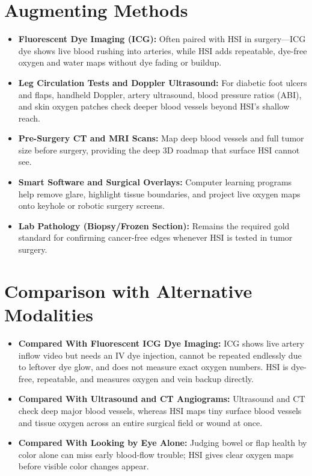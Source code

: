 \section{Augmenting Methods}
\begin{itemize}
    \item \textbf{Fluorescent Dye Imaging (ICG):} Often paired with HSI in surgery---ICG dye shows live blood rushing into arteries, while HSI adds repeatable, dye-free oxygen and water maps without dye fading or buildup.
    \item \textbf{Leg Circulation Tests and Doppler Ultrasound:} For diabetic foot ulcers and flaps, handheld Doppler, artery ultrasound, blood pressure ratios (ABI), and skin oxygen patches check deeper blood vessels beyond HSI's shallow reach.
    \item \textbf{Pre-Surgery CT and MRI Scans:} Map deep blood vessels and full tumor size before surgery, providing the deep 3D roadmap that surface HSI cannot see.
    \item \textbf{Smart Software and Surgical Overlays:} Computer learning programs help remove glare, highlight tissue boundaries, and project live oxygen maps onto keyhole or robotic surgery screens.
    \item \textbf{Lab Pathology (Biopsy/Frozen Section):} Remains the required gold standard for confirming cancer-free edges whenever HSI is tested in tumor surgery.
\end{itemize}

\section{Comparison with Alternative Modalities}
\begin{itemize}
    \item \textbf{Compared With Fluorescent ICG Dye Imaging:} ICG shows live artery inflow video but needs an IV dye injection, cannot be repeated endlessly due to leftover dye glow, and does not measure exact oxygen numbers. HSI is dye-free, repeatable, and measures oxygen and vein backup directly.
    \item \textbf{Compared With Ultrasound and CT Angiograms:} Ultrasound and CT check deep major blood vessels, whereas HSI maps tiny surface blood vessels and tissue oxygen across an entire surgical field or wound at once.
    \item \textbf{Compared With Looking by Eye Alone:} Judging bowel or flap health by color alone can miss early blood-flow trouble; HSI gives clear oxygen maps before visible color changes appear.
\end{itemize}

